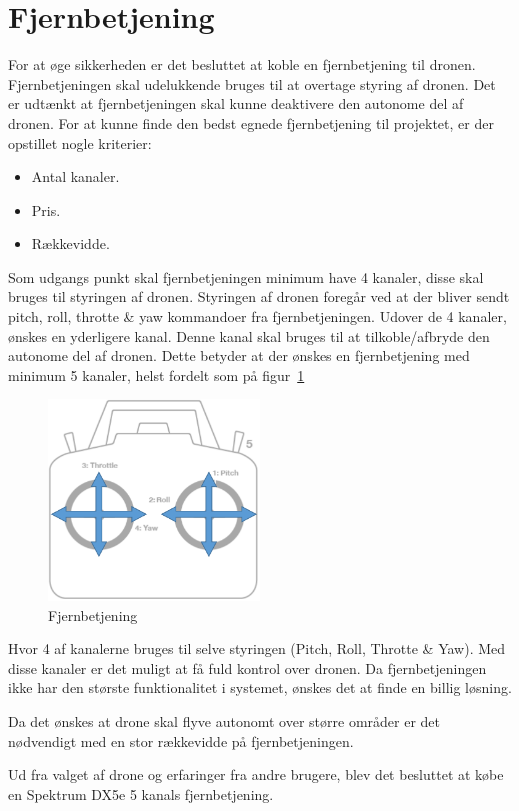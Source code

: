 \section{Fjernbetjening}

For at øge sikkerheden er det besluttet at koble en fjernbetjening til dronen. Fjernbetjeningen skal udelukkende bruges til at overtage styring af dronen. Det er udtænkt at fjernbetjeningen skal kunne deaktivere den autonome del af dronen. For at kunne finde den bedst egnede fjernbetjening til projektet, er der opstillet nogle kriterier:

\begin{itemize}
	\item Antal kanaler.
	\item Pris.
	\item Rækkevidde.
\end{itemize}

Som udgangs punkt skal fjernbetjeningen minimum have 4 kanaler, disse skal bruges til styringen af dronen. Styringen af dronen foregår ved at der bliver sendt pitch, roll, throtte \& yaw kommandoer fra fjernbetjeningen.  Udover de 4 kanaler, ønskes en yderligere kanal. Denne kanal skal bruges til at tilkoble/afbryde den autonome del af dronen. Dette betyder at der ønskes en fjernbetjening med minimum 5 kanaler, helst fordelt som på figur~\ref{fig:fjernbetjening} 

\begin{figure}[H]
\centering
\includegraphics[width=0.5\textwidth]{Billeder/Fjernbetjening}
\caption{Fjernbetjening}
\label{fig:fjernbetjening}
\end{figure}

Hvor 4 af kanalerne bruges til selve styringen (Pitch, Roll, Throtte \& Yaw). Med disse kanaler er det muligt at få fuld kontrol over dronen.
Da fjernbetjeningen ikke har den største funktionalitet i systemet, ønskes det at finde en billig løsning. 

Da det ønskes at drone skal flyve autonomt over større områder er det nødvendigt med en stor rækkevidde på fjernbetjeningen.  

Ud fra valget af drone og erfaringer fra andre brugere, blev det besluttet at købe en Spektrum DX5e 5 kanals fjernbetjening.